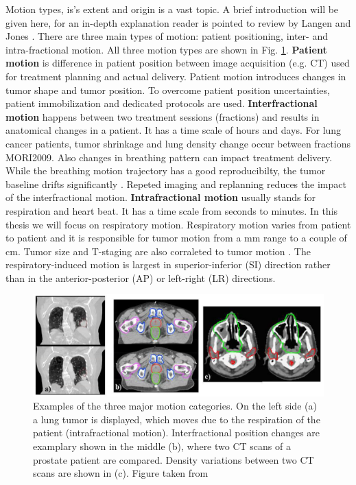 \documentclass[type=dr, dr=rernat, accentcolor=tud7b,colorbacktitle, bigchapter, openright, twoside, 12pt ]{tudthesis}
\begin{document}
Motion types, is's extent and origin is a vast topic. A brief introduction will be given here, for an in-depth explanation reader is pointed to review by Langen and Jones \cite{Langen2001}.
There are three main types of motion: patient positioning, inter- and intra-fractional motion. All three motion types are shown in Fig. \ref{motion}.
\newline
\textbf{Patient motion} is difference in patient position between image acquisition (e.g. CT) used for treatment planning and actual delivery. Patient motion introduces changes in tumor shape and tumor position. To overcome patient 
position uncertainties, patient immobilization and dedicated protocols are used.
\newline
\textbf{Interfractional motion} happens between two treatment sessions (fractions) and results in anatomical changes in a patient. It has a time scale of hours and days. For lung cancer patients, tumor shrinkage and lung density change occur between fractions MORI2009. 
Also changes in breathing pattern can impact treatment delivery. While the breathing motion trajectory has a good reproducibilty, the tumor baseline drifts significantly \cite{Sonke2008}. Repeted imaging and replanning reduces the impact of the interfractional motion.
\newline
\textbf{Intrafractional motion} usually stands for respiration and heart beat. It has a time scale from seconds to minutes. In this thesis we will focus on respiratory motion. Respiratory motion varies from patient to patient and 
it is responsible for tumor motion from a mm range to a couple of cm. Tumor size and T-staging are also corraleted to tumor motion \cite{Liu2007}. The respiratory-induced motion is largest in superior-inferior (SI) direction rather than 
in the anterior-posterior (AP) or left-right (LR) directions.


\begin{figure}[H]
\begin{center}
\includegraphics[scale=0.43]{./Images/motion_examples.png}
\caption{Examples of the three major motion categories. On the left side (a) a lung tumor is displayed, which moves due to the respiration 
of the patient (intrafractional motion). Interfractional position changes are examplary shown in the middle (b), where two CT scans of a 
prostate patient are compared. Density variations between two CT scans are shown in (c). Figure taken from \cite{Eng11}}
\label{motion}
\end{center}
\end{figure}
\end{document}
